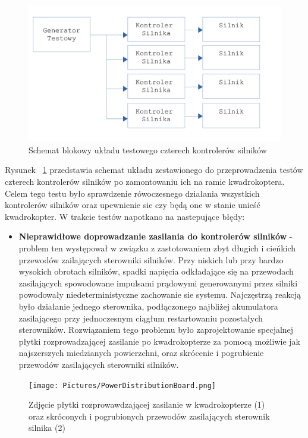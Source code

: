 \begin{figure}[H]
	\centering
	\includegraphics[scale=0.2]{Pictures/TestyKontroleraSilnikow_x4.png}
	\caption[Schemat blokowy układu testowego czterech kontrolerów silników]{Schemat blokowy układu testowego czterech kontrolerów silników}
	\label{fig:MotorController_test_four}
\end{figure}

Rysunek ~\ref{fig:MotorController_test_four} przedstawia schemat układu zestawionego do przeprowadzenia testów czterech kontrolerów silników po zamontowaniu ich na ramie kwadrokoptera. Celem tego testu było sprawdzenie rówoczesnego działania wszystkich kontrolerów silników oraz upewnienie sie czy będą one w stanie unieść kwadrokopter. W trakcie testów napotkano na nastepujące błędy:
\begin{itemize}
	\item \textbf{Nieprawidłowe doprowadzanie zasilania do kontrolerów silników} - problem ten występował w związku z zastotowaniem zbyt długich i cieńkich przewodów zailających sterowniki silników. Przy niskich lub przy bardzo wysokich obrotach silników, spadki napięcia odkładające się na przewodach zasilających spowodowane impulsami prądowymi generowanymi przez silniki powodowały niedeterministyczne zachowanie sie systemu. Najczęstrzą reakcją było działanie jednego sterownika, podłączonego najbliżej akumulatora zasilającego przy jednoczesnym ciągłum restartowaniu pozostałych sterowników. Rozwiązaniem tego problemu było zaprojektowanie specjalnej płytki rozprowadzającej zasilanie po kwadrokopterze za pomocą możliwie jak najszerszych miedzianych powierzchni, oraz skrócenie i pogrubienie przewodów zasilających sterowniki silników.
\end{itemize}

\begin{figure}[H]
	\centering
	\texttt{[image: Pictures/PowerDistributionBoard.png]}
	\caption[Zdjęcie płytki rozprowawdzającej zasilanie w kwadrokopterze (1) oraz skróconych i pogrubionych przewodów zasilających sterownik silnika (2)]{Zdjęcie płytki rozprowawdzającej zasilanie w kwadrokopterze (1) oraz skróconych i pogrubionych przewodów zasilających sterownik silnika (2)}
	\label{fig:PowerDistribudionBoard}
\end{figure}

